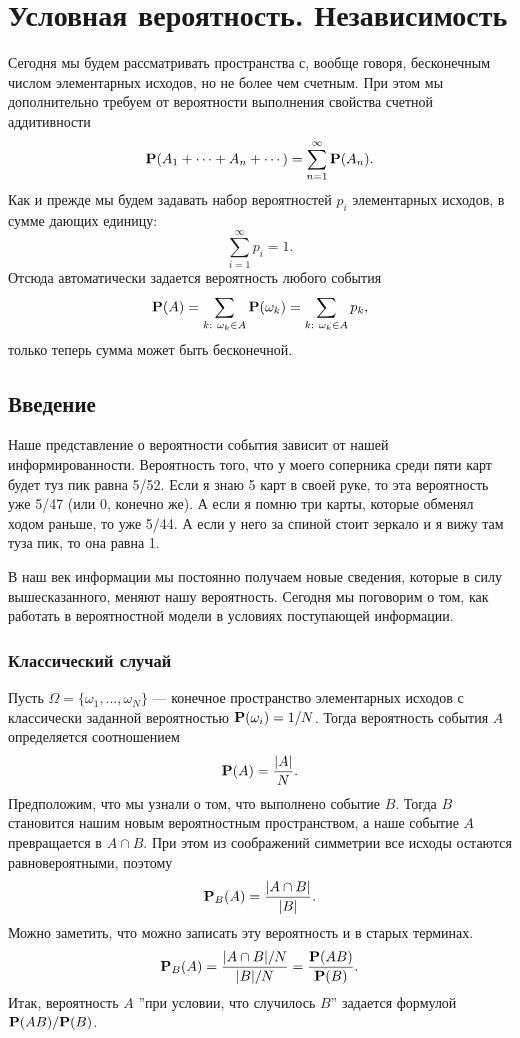 \documentclass[11 pt,russian]{article}
\begin{document}
\newenvironment{enumerate*}%
  {\begin{enumerate}%
    \setlength{\itemsep}{1pt}%
    \setlength{\parskip}{1pt}}%
  {\end{enumerate}}
  \newtheorem{Th}{Теорема}
    \newtheorem{Lemm}{Лемма}
  \theoremstyle{definition}
  \newtheorem{Rem}{Замечание}
  \newtheorem{Que}{Вопрос}
  \newtheorem{Exam}{Пример}
    \newtheorem{Def}{Определение}
\setcounter{section}{1}
\section{Условная вероятность. Независимость}
Сегодня мы будем рассматривать пространства с, вообще говоря, бесконечным числом элементарных исходов, но не более чем счетным. 
При этом мы дополнительно требуем от вероятности выполнения свойства счетной аддитивности
$$
{\bf P}(A_1 + \dotsb + A_n +\dotsb) = \sum_{n=1}^{\infty} {\bf P}(A_n). 
$$
Как и прежде мы будем задавать набор вероятностей $p_i$ элементарных исходов, в сумме дающих единицу:
$$
\sum_{i=1}^{\infty} p_i = 1.
$$
Отсюда автоматически задается вероятность любого события
$$
{\bf P}(A) = \sum_{k:\ \omega_k\in A} {\bf P}(\omega_k) = \sum_{k:\ \omega_k\in A} p_k,
$$
только теперь сумма может быть бесконечной.
\subsection{Введение}
Наше представление о вероятности события зависит от нашей информированности. Вероятность того, что у моего соперника среди пяти карт будет туз пик равна 5/52. Если я знаю 5 карт в своей руке, то эта вероятность уже 5/47 (или 0, конечно же). А если я помню три карты, которые обменял ходом раньше, то уже 5/44. А если у него за спиной стоит зеркало и я вижу там туза пик, то она равна 1. 

В наш век информации мы постоянно получаем новые сведения, которые в силу вышесказанного, меняют нашу вероятность. Сегодня мы поговорим о том, как работать в вероятностной модели в условиях поступающей информации.
\subsubsection{Классический случай}
Пусть $\Omega=\{\omega_1,\dotsc,\omega_N\}$ --- конечное пространство элементарных исходов с классически заданной вероятностью ${\bf P}(\omega_i) = 1/N$. Тогда вероятность события $A$ определяется соотношением
$$
{\bf P}(A) = \frac{|A|}{N}.
$$
Предположим, что мы узнали о том, что выполнено событие $B$. Тогда $B$ становится нашим новым вероятностным пространством, а наше событие $A$ превращается в $A\cap B$. При этом из соображений симметрии все исходы остаются равновероятными, поэтому
$$
{\bf P}_B(A) = \frac{|A\cap B|}{|B|}.
$$ 
Можно заметить, что можно записать эту вероятность и в старых терминах.
$$
{\bf P}_{B}(A) =  \frac{|A\cap B|/N}{|B|/N} =  \frac{{\bf P}(AB)}{{\bf P}(B)}.
$$
Итак, вероятность $A$ ''при условии, что случилось $B$'' задается формулой ${\bf P}(AB)/{\bf P}(B)$.
\end{document}
